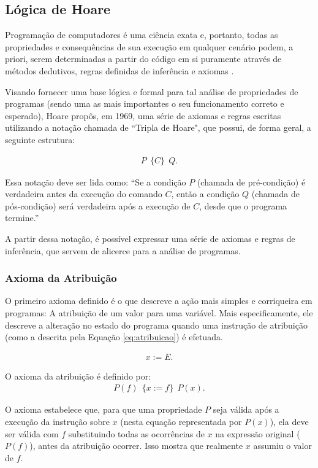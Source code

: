 \documentclass{article}
\begin{document}
    
\subsection{Lógica de Hoare}

Programação de computadores é uma ciência exata e, portanto, todas as propriedades e consequências de sua execução em qualquer cenário podem, a priori, serem determinadas a partir do código em si puramente através de métodos dedutivos, regras definidas de inferência e axiomas \cite{hoare1969axiomatic}. 

Visando fornecer uma base lógica e formal para tal análise de propriedades de programas (sendo uma as mais importantes o seu funcionamento correto e esperado), Hoare propôs, em 1969, uma série de axiomas e regras escritas utilizando a notação chamada de “Tripla de Hoare", que possui, de forma geral, a seguinte estrutura:

\begin{align}
    P \ \  \{C\} \ \ Q.
\end{align}

Essa notação deve ser lida como: “Se a condição \( P \) (chamada de pré-condição) é verdadeira antes da execução do comando \( C \), então a condição \( Q \) (chamada de pós-condição) será verdadeira após a execução de \( C \), desde que o programa termine.”

A partir dessa notação, é possível expressar uma série de axiomas e regras de inferência, que servem de alicerce para a análise de programas. 

\subsubsection{Axioma da Atribuição}

O primeiro axioma definido é o que descreve a ação mais simples e corriqueira em programas: A atribuição de um valor para uma variável. Mais especificamente, ele descreve a alteração no estado do programa quando uma instrução de atribuição (como a descrita pela Equação \ref{eq:atribuicao}) é efetuada.

\begin{align}
    x := E.
    \label{eq:atribuicao}
\end{align}

O axioma da atribuição é definido por:
\begin{align}
    P(f) \ \  \{x := f\}  \ \ P(x).
\end{align}

O axioma estabelece que, para que uma propriedade \( P \) seja válida após a execução da instrução sobre $x$ (nesta equação representada por $P(x)$), ela deve ser válida com \( f \) substituindo todas as ocorrências de \( x \) na expressão original ($P(f)$), antes da atribuição ocorrer. Isso mostra que realmente $x$ assumiu o valor de $f$.
\end{document}
